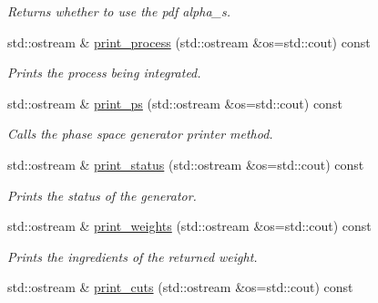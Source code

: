 \begin{DoxyCompactItemize}
\begin{DoxyCompactList}\small\item\em Returns whether to use the pdf alpha\+\_\+s. \end{DoxyCompactList}\item 
\hypertarget{a00436_aa4098eeba2b0f5b50d53b3dfac9eb0a0}{}std\+::ostream \& \hyperlink{a00436_aa4098eeba2b0f5b50d53b3dfac9eb0a0}{print\+\_\+process} (std\+::ostream \&os=std\+::cout) const \label{a00436_aa4098eeba2b0f5b50d53b3dfac9eb0a0}

\begin{DoxyCompactList}\small\item\em Prints the process being integrated. \end{DoxyCompactList}\item 
\hypertarget{a00436_a7d1941d4bacdacd4ee642919a8cf12d9}{}std\+::ostream \& \hyperlink{a00436_a7d1941d4bacdacd4ee642919a8cf12d9}{print\+\_\+ps} (std\+::ostream \&os=std\+::cout) const \label{a00436_a7d1941d4bacdacd4ee642919a8cf12d9}

\begin{DoxyCompactList}\small\item\em Calls the phase space generator printer method. \end{DoxyCompactList}\item 
\hypertarget{a00436_a1f20b9aabbfaa47a6594eb28cf9164b5}{}std\+::ostream \& \hyperlink{a00436_a1f20b9aabbfaa47a6594eb28cf9164b5}{print\+\_\+status} (std\+::ostream \&os=std\+::cout) const \label{a00436_a1f20b9aabbfaa47a6594eb28cf9164b5}

\begin{DoxyCompactList}\small\item\em Prints the status of the generator. \end{DoxyCompactList}\item 
\hypertarget{a00436_ac35a8c16fd72c4c6c38b6a44e75da07c}{}std\+::ostream \& \hyperlink{a00436_ac35a8c16fd72c4c6c38b6a44e75da07c}{print\+\_\+weights} (std\+::ostream \&os=std\+::cout) const \label{a00436_ac35a8c16fd72c4c6c38b6a44e75da07c}

\begin{DoxyCompactList}\small\item\em Prints the ingredients of the returned weight. \end{DoxyCompactList}\item 
\hypertarget{a00436_afa8b12752091958a7b2fd0f1fbc69c08}{}std\+::ostream \& \hyperlink{a00436_afa8b12752091958a7b2fd0f1fbc69c08}{print\+\_\+cuts} (std\+::ostream \&os=std\+::cout) const \label{a00436_afa8b12752091958a7b2fd0f1fbc69c08}


\end{DoxyCompactItemize}
